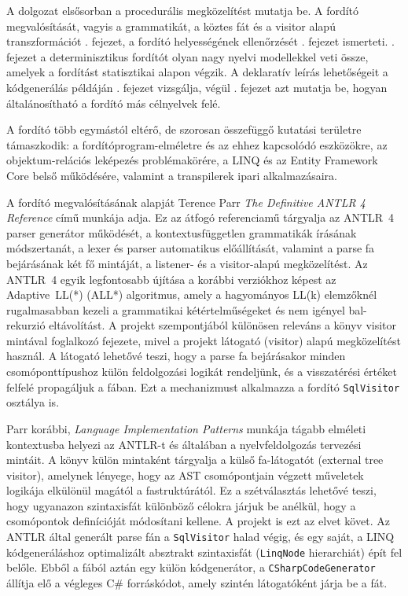 A dolgozat elsősorban a procedurális megközelítést mutatja be. A fordító megvalósítását, vagyis a grammatikát, a köztes fát és a visitor alapú transzformációt . fejezet, a fordító helyességének ellenőrzését . fejezet ismerteti. . fejezet a determinisztikus fordítót olyan nagy nyelvi modellekkel veti össze, amelyek a fordítást statisztikai alapon végzik. A deklaratív leírás lehetőségeit a kódgenerálás példáján . fejezet vizsgálja, végül . fejezet azt mutatja be, hogyan általánosítható a fordító más célnyelvek felé.


A fordító több egymástól eltérő, de szorosan összefüggő kutatási területre támaszkodik: a for\-dí\-tó\-prog\-ram-elméletre és az ehhez kapcsolódó eszközökre, az objektum-relációs leképezés problémakörére, a LINQ és az Entity Framework Core belső működésére, valamint a transpilerek ipari alkalmazásaira.


A fordító megvalósításának alapját Terence Parr \textit{The Definitive ANTLR 4 Reference} \cite{parr2013antlr4} című munkája adja. Ez az átfogó referenciamű tárgyalja az ANTLR~4 parser generátor működését, a kontextusfüggetlen grammatikák írásának módszertanát, a lexer és parser automatikus előállítását, valamint a parse fa bejárásának két fő mintáját, a listener- és a visitor-alapú megközelítést. Az ANTLR~4 egyik legfontosabb újítása a korábbi verziókhoz képest az Adaptive~LL(*) (ALL*) algoritmus, amely a hagyományos LL(k) elemzőknél rugalmasabban kezeli a grammatikai kétértelműségeket és nem igényel bal-rekurzió eltávolítást. A projekt szempontjából különösen releváns a könyv visitor mintával foglalkozó fejezete, mivel a projekt látogató (visitor) alapú megközelítést használ. A látogató lehetővé teszi, hogy a parse fa bejárásakor minden csomóponttípushoz külön feldolgozási logikát rendeljünk, és a visszatérési értéket felfelé propagáljuk a fában. Ezt a mechanizmust alkalmazza a fordító \texttt{SqlVisitor} osztálya is.

Parr korábbi, \textit{Language Implementation Patterns} \cite{parr2009lip} munkája tágabb elméleti kontextusba helyezi az ANTLR-t és általában a nyelvfeldolgozás tervezési mintáit. A könyv külön mintaként tárgyalja a külső fa-látogatót (external tree visitor), amelynek lényege, hogy az AST csomópontjain végzett műveletek logikája elkülönül magától a fastruktúrától. Ez a szétválasztás lehetővé teszi, hogy ugyanazon szintaxisfát különböző célokra járjuk be anélkül, hogy a csomópontok definícióját módosítani kellene. A projekt is ezt az elvet követ. Az ANTLR által generált parse fán a \texttt{SqlVisitor} halad végig, és egy saját, a LINQ kódgeneráláshoz optimalizált absztrakt szintaxisfát (\texttt{LinqNode} hierarchiát) épít fel belőle. Ebből a fából aztán egy külön kódgenerátor, a \texttt{CSharpCodeGenerator} állítja elő a végleges C\# forráskódot, amely szintén látogatóként járja be a fát.

